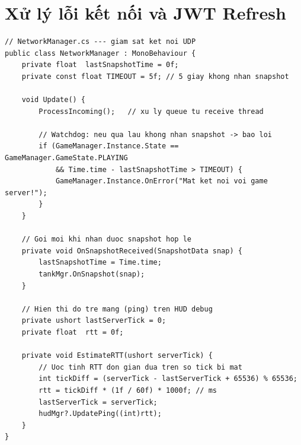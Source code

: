 \documentclass[12pt,a4paper]{report}
\begin{document}
\section{Xử lý lỗi kết nối và JWT Refresh}

\begin{lstlisting}[style=bashStyle, caption={Watchdog timer kiểm tra kết nối UDP}, label={lst:watchdog}]
// NetworkManager.cs --- giam sat ket noi UDP
public class NetworkManager : MonoBehaviour {
    private float  lastSnapshotTime = 0f;
    private const float TIMEOUT = 5f; // 5 giay khong nhan snapshot

    void Update() {
        ProcessIncoming();   // xu ly queue tu receive thread

        // Watchdog: neu qua lau khong nhan snapshot -> bao loi
        if (GameManager.Instance.State == GameManager.GameState.PLAYING
            && Time.time - lastSnapshotTime > TIMEOUT) {
            GameManager.Instance.OnError("Mat ket noi voi game server!");
        }
    }

    // Goi moi khi nhan duoc snapshot hop le
    private void OnSnapshotReceived(SnapshotData snap) {
        lastSnapshotTime = Time.time;
        tankMgr.OnSnapshot(snap);
    }

    // Hien thi do tre mang (ping) tren HUD debug
    private ushort lastServerTick = 0;
    private float  rtt = 0f;

    private void EstimateRTT(ushort serverTick) {
        // Uoc tinh RTT don gian dua tren so tick bi mat
        int tickDiff = (serverTick - lastServerTick + 65536) % 65536;
        rtt = tickDiff * (1f / 60f) * 1000f; // ms
        lastServerTick = serverTick;
        hudMgr?.UpdatePing((int)rtt);
    }
}
\end{lstlisting}
\end{document}
